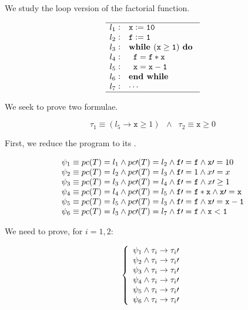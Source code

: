 


We study the loop version of the factorial function.


\[
	\begin{array}{l@{\hspace{0.3em}}c@{\hspace{1em}}l}
	\hline
		l_1 & : & \mathtt{x := 10} \\
		l_2 & : & \mathtt{f := 1} \\
		l_3 & : & \mathtt{\textbf{while } (x\geq 1) \textbf{ do }} \\
		l_4 & : & \mathtt{\;\;f = f*x} \\
		l_5 & : & \mathtt{\;\;x=x-1} \\ 	
		l_6 & : & \mathtt{\textbf{end while}}\\
		l_7 & : & \mathtt{\cdots}\\
	\hline
	\end{array}
\]
\label{simple:example}




We seek to prove two formulae.

\[\tau_1 \equiv (l_5 \to \mathtt{x}\geq 1) \;\; \wedge \;\; \tau_2 \equiv \mathtt{x} \geq 0\]

First, we reduce the program to its \VC.


\[
	\begin{array}{l}
		 \psi_1 \equiv pc(T) = l_1 \wedge pc\prime (T) = l_2 \wedge \mathtt{f\prime =f} \wedge \mathtt{x}\prime  = 10\\
		 \psi_2 \equiv pc(T) = l_2 \wedge pc\prime (T) = l_3 \wedge \mathtt{f}\prime  = 1 \wedge x\prime =x\\
		 \psi_3 \equiv pc(T) = l_3 \wedge pc\prime (T) = l_4 \wedge \mathtt{f\prime =f} \wedge x\prime \geq 1\\
		 \psi_4 \equiv pc(T) = l_4 \wedge pc\prime (T) = l_5 \wedge \mathtt{f}\prime  = \mathtt{f*x} \wedge \mathtt{x\prime =x}\\
		 \psi_5 \equiv pc(T) = l_5 \wedge pc\prime (T) = l_3 \wedge \mathtt{f\prime =f} \wedge \mathtt{x\prime =x-1}\\
		 \psi_6 \equiv pc(T) = l_3 \wedge pc\prime (T) = l_7 \wedge \mathtt{f\prime =f} \wedge \mathtt{x<1}
	\end{array}
\]

We need to prove, for $i=1,2$:

\[
	\left\{
		\begin{array}{l}
			\psi_1 \wedge \tau_i \to \tau_i\prime  \\
			\psi_2 \wedge \tau_i \to \tau_i\prime \\
			\psi_3 \wedge \tau_i \to \tau_i\prime  \\
			\psi_4 \wedge \tau_i \to \tau_i\prime \\
			\psi_5 \wedge \tau_i \to \tau_i\prime  \\
			\psi_6 \wedge \tau_i \to \tau_i\prime 
		\end{array}
	\right.
\]

